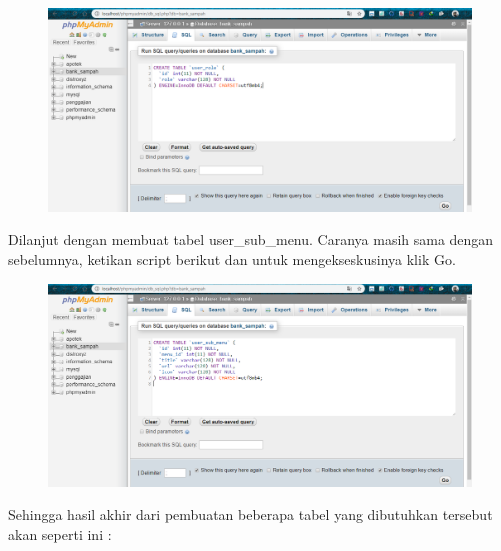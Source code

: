 \begin{figure}[H]
\centering
\includegraphics[width=1\textwidth]{figures/database/13.png}
\end{figure}

\noindent
Dilanjut dengan membuat tabel user\_sub\_menu. Caranya masih sama dengan sebelumnya, ketikan script berikut dan untuk mengekseskusinya klik Go.



\begin{figure}[H]
\centering
\includegraphics[width=1\textwidth]{figures/database/14.png}
\end{figure}

\noindent
Sehingga hasil akhir dari pembuatan beberapa tabel yang dibutuhkan  tersebut akan seperti ini :

